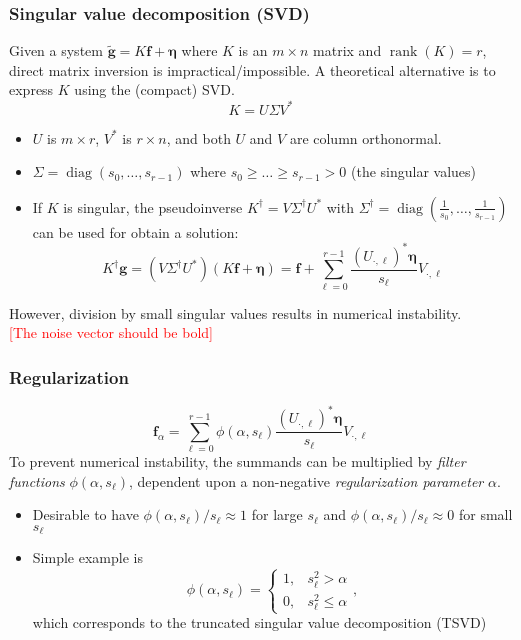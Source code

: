 \documentclass{beamer}
\newcommand{\ToDo}[1]{\textcolor{red}{[#1]}}
\newcommand{\noise}{\eta}	%
\newcommand{\gVec}{\mathbf{g}}	%
\newcommand{\gnoiseVec}{\widetilde{\mathbf{g}}}	%
\newcommand{\kMat}{K}	%
\newcommand{\fVec}{\mathbf{f}}	%
\newcommand{\ctrans}{*}	%
\DeclareMathOperator{\diag}{diag}	%
\DeclareMathOperator{\rank}{rank}	%
\newcommand{\noiseVec}{\mathbf{\noise}}	%
\newcommand{\singular}{s}	%
\newcommand{\regparam}{\alpha}
\newcommand{\filt}{\phi}
\begin{document}
\begin{frame}
\frametitle{Singular value decomposition (SVD)}
Given a system $\gnoiseVec = \kMat\fVec + \noiseVec$ where $\kMat$ is an $m \times n$ matrix and $\rank(\kMat) = r$, direct matrix inversion is impractical/impossible. A theoretical alternative is to express $\kMat$ using the (compact) SVD.
\[\kMat = U\Sigma{V^\ctrans}\]
\begin{itemize}
\item $U$ is $m \times r$, $V^\ctrans$ is $r \times n$, and both $U$ and $V$ are column orthonormal.
\item $\Sigma = \diag(\singular_0,\ldots,\singular_{r-1})$ where $s_0 \geq \ldots \geq \singular_{r-1} > 0$ (the singular values)
\item If $\kMat$ is singular, the pseudoinverse $K^\dagger = V\Sigma^\dagger{U}^\ctrans$ with $\Sigma^\dagger = \diag\left(\frac{1}{\singular_0},\ldots,\frac{1}{\singular_{r-1}}\right)$ can be used for obtain a solution:
\[\kMat^\dagger{\gVec} = (V\Sigma^\dagger{U}^\ctrans)(\kMat\fVec + \noiseVec) = \fVec + \sum_{\ell=0}^{r-1} \frac{(U_{\cdot,\ell})^\ctrans{\noiseVec}}{\singular_{\ell}}V_{\cdot,\ell}\]
\end{itemize}
However, division by small singular values results in numerical instability. \\
\ToDo{The noise vector should be bold}
\end{frame}

\begin{frame}
\frametitle{Regularization}
\[\fVec_\regparam = \sum_{\ell=0}^{r-1} \filt(\regparam,\singular_\ell)\frac{(U_{\cdot,\ell})^\ctrans{\noiseVec}}{\singular_{\ell}}V_{\cdot,\ell}\]
To prevent numerical instability, the summands can be multiplied by \textit{filter functions} $\filt(\regparam,\singular_{\ell})$, dependent upon a non-negative \textit{regularization parameter} $\regparam$.
\begin{itemize}
\item Desirable to have $\filt(\regparam,\singular_\ell)/\singular_\ell \approx 1$ for large $\singular_\ell$ and $\filt(\regparam,\singular_\ell)/\singular_\ell \approx 0$ for small $\singular_\ell$
\item Simple example is 
\[\filt(\regparam,\singular_\ell) = \begin{cases}
1, & \singular^2_\ell > \regparam \\
0, & \singular^2_\ell \leq \regparam
\end{cases},\]
which corresponds to the truncated singular value decomposition (TSVD) \cite{Vogel:2002}
\end{itemize}
\end{frame}
\end{document}
